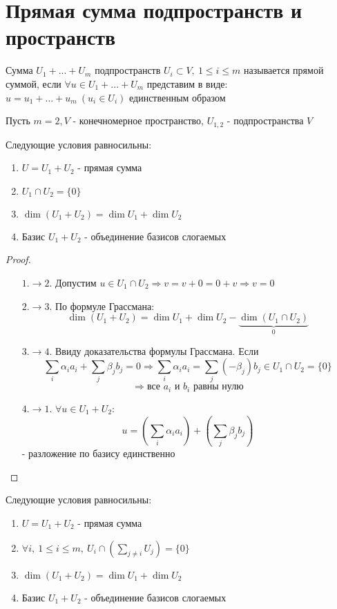 \section{Прямая сумма подпространств и пространств}
    \begin{definition}
        Сумма $U_1+...+U_m$ подпространств $U_i \subset V, \ 1\leq i \leq m$ называется прямой суммой, если 
        $\forall u \in U_1+...+U_m$  представим в виде: \\$u = u_1+...+u_m \ (u_i \in U_i)$  единственным образом    
    \end{definition} 
    Пусть $m=2, V$ - конечномерное пространство, $U_{1,2}$ - подпространства $V$
    \begin{theorem}
        Следующие условия равносильны: 
        \begin{enumerate}
            \item $U = U_1 + U_2$ - прямая сумма
            \item $U_1 \cap U_2 = \{0\}$
            \item $\dim (U_1 + U_2) = \dim U_1 + \dim U_2$
            \item Базис $U_1 + U_2$ - объединение базисов слогаемых    
        \end{enumerate} 
    \end{theorem} 
    \begin{proof}\tab
        \begin{itemize}
            \item[$1. \to 2.$] Допустим $u \in U_1 \cap U_2 \Longrightarrow v = v + 0 = 0 + v \Longrightarrow v = 0$
            \item[$2. \to 3.$] По формуле Грассмана: 
            $$\dim (U_1 + U_2) = \dim U_1 + \dim U_2 - \underbrace{\dim (U_1 \cap U_2)}_{0}$$
            \item[$3. \to 4.$] Ввиду доказательства формулы Грассмана. Если $$\sum \limits_{i} \alpha_i a_i + \sum \limits_{j} \beta_j b_j = 0 \Longrightarrow \sum \limits_{i} \alpha_i a_i = \sum \limits_{j} (-\beta_j) b_j \in U_1 \cap U_2 = \{0\}$$
            $$\Longrightarrow  \text{все } a_i \text{ и } b_i \text{ равны нулю}$$
            \item[$4. \to 1.$] $\forall u \in U_1 + U_2: $ $$
            u = (\sum \limits_{i} \alpha_i a_i) + (\sum \limits_{j} \beta_j b_j)$$ 
            - разложение по базису единственно  
        \end{itemize}
    \end{proof}
    \begin{theorem}
        Следующие условия равносильны: 
        \begin{enumerate}
            \item $U = U_1 + U_2$ - прямая сумма
            \item $\forall i, \ 1 \leq i \leq m, \ U_i \cap (\sum \limits_{j \neq i}U_j) = \{0\}$
            \item $\dim (U_1 + U_2) = \dim U_1 + \dim U_2$
            \item Базис $U_1 + U_2$ - объединение базисов слогаемых    
        \end{enumerate} 
    \end{theorem}

